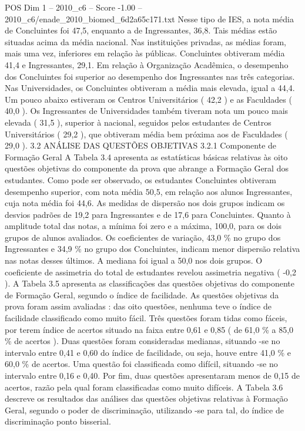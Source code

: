 \begin{textsample}{POS Dim 1 – 2010\_c6 – Score -1.00 – 2010\_c6/enade\_2010\_biomed\_6d2a65c171.txt}
Nesse tipo de IES, a nota média de Concluintes foi 47,5, enquanto a de Ingressantes, 36,8.
Tais médias estão situadas acima da média nacional.
Nas instituições privadas, as médias foram, mais uma vez, inferiores em relação às públicas.
Concluintes obtiveram média 41,4 e Ingressantes, 29,1.
Em relação à Organização Acadêmica, o desempenho dos Concluintes foi superior ao desempenho dos Ingressantes nas três categorias.
Nas Universidades, os Concluintes obtiveram a média mais elevada, igual a 44,4.
Um pouco abaixo estiveram os Centros Universitários ( 42,2 ) e as Faculdades ( 40,0 ).
Os Ingressantes de Universidades também tiveram nota um pouco mais elevada ( 31,5 ), superior à nacional, seguidos pelos estudantes de Centros Universitários ( 29,2 ), que obtiveram média bem próxima aos de Faculdades ( 29,0 ). 3.2 ANÁLISE DAS QUESTÕES OBJETIVAS 3.2.1 Componente de Formação Geral A Tabela 3.4 apresenta as estatísticas básicas relativas às oito questões objetivas do componente da prova que abrange a Formação Geral dos estudantes.
Como pode ser observado, os estudantes Concluintes obtiveram desempenho superior, com nota média 50,5, em relação aos alunos Ingressantes, cuja nota média foi 44,6.
As medidas de dispersão nos dois grupos indicam os desvios padrões de 19,2 para Ingressantes e de 17,6 para Concluintes.
Quanto à amplitude total das notas, a mínima foi zero e a máxima, 100,0, para os dois grupos de alunos avaliados.
Os coeficientes de variação, 43,0 \% no grupo dos Ingressantes e 34,9 \% no grupo dos Concluintes, indicam menor dispersão relativa nas notas desses últimos.
A mediana foi igual a 50,0 nos dois grupos.
O coeficiente de assimetria do total de estudantes revelou assimetria negativa ( -0,2 ).
A Tabela 3.5 apresenta as classificações das questões objetivas do componente de Formação Geral, segundo o índice de facilidade.
As questões objetivas da prova foram assim avaliadas : das oito questões, nenhuma teve o índice de facilidade classificado como muito fácil.
Três questões foram tidas como fáceis, por terem índice de acertos situado na faixa entre 0,61 e 0,85 ( de 61,0 \% a 85,0 \% de acertos ).
Duas questões foram consideradas medianas, situando -se no intervalo entre 0,41 e 0,60 do índice de facilidade, ou seja, houve entre 41,0 \% e 60,0 \% de acertos.
Uma questão foi classificada como difícil, situando -se no intervalo entre 0,16 e 0,40.
Por fim, duas questões apresentaram menos de 0,15 de acertos, razão pela qual foram classificadas como muito difíceis.
A Tabela 3.6 descreve os resultados das análises das questões objetivas relativas à Formação Geral, segundo o poder de discriminação, utilizando -se para tal, do índice de discriminação ponto bisserial.

\end{textsample}
